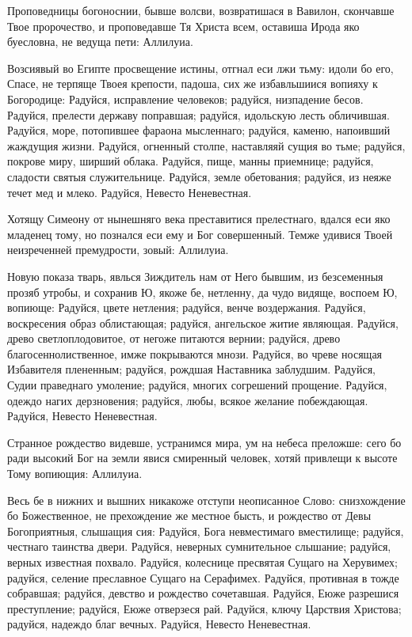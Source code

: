\begin{mymulticols}

Проповедницы богоноснии, бывше волсви, возвратишася в Вавилон, скончавше Твое пророчество, и проповедавше Тя Христа всем, оставиша Ирода яко буесловна, не ведуща пети: Аллилуиа.


Возсиявый во Египте просвещение истины, отгнал еси лжи тьму: идоли бо его, Спасе, не терпяще Твоея крепости, падоша, сих же избавльшиися вопияху к Богородице: Радуйся, исправление человеков; радуйся, низпадение бесов. Радуйся, прелести державу поправшая; радуйся, идольскую лесть обличившая. Радуйся, море, потопившее фараона мысленнаго; радуйся, каменю, напоивший жаждущия жизни. Радуйся, огненный столпе, наставляяй сущия во тьме; радуйся, покрове миру, ширший облака. Радуйся, пище, манны приемнице; радуйся, сладости святыя служительнице. Радуйся, земле обетования; радуйся, из неяже течет мед и млеко. Радуйся, Невесто Неневестная.


Хотящу Симеону от нынешняго века преставитися прелестнаго, вдался еси яко младенец тому, но познался еси ему и Бог совершенный. Темже удивися Твоей неизреченней премудрости, зовый: Аллилуиа.


Новую показа тварь, явлься Зиждитель нам от Него бывшим, из безсеменныя прозяб утробы, и сохранив Ю, якоже бе, нетленну, да чудо видяще, воспоем Ю, вопиюще: Радуйся, цвете нетления; радуйся, венче воздержания. Радуйся, воскресения образ облистающая; радуйся, ангельское житие являющая. Радуйся, древо светлоплодовитое, от негоже питаются вернии; радуйся, древо благосеннолиственное, имже покрываются мнози. Радуйся, во чреве носящая Избавителя плененным; радуйся, рождшая Наставника заблудшим. Радуйся, Судии праведнаго умоление; радуйся, многих согрешений прощение. Радуйся, одеждо нагих дерзновения; радуйся, любы, всякое желание побеждающая. Радуйся, Невесто Неневестная.


Странное рождество видевше, устранимся мира, ум на небеса преложше: сего бо ради высокий Бог на земли явися смиренный человек, хотяй привлещи к высоте Тому вопиющия: Аллилуиа.


Весь бе в нижних и вышних никакоже отступи неописанное Слово: снизхождение бо Божественное, не прехождение же местное бысть, и рождество от Девы Богоприятныя, слышащия сия: Радуйся, Бога невместимаго вместилище; радуйся, честнаго таинства двери. Радуйся, неверных сумнительное слышание; радуйся, верных известная похвало. Радуйся, колеснице пресвятая Сущаго на Херувимех; радуйся, селение преславное Сущаго на Серафимех. Радуйся, противная в тожде собравшая; радуйся, девство и рождество сочетавшая. Радуйся, Еюже разрешися преступление; радуйся, Еюже отверзеся рай. Радуйся, ключу Царствия Христова; радуйся, надеждо благ вечных. Радуйся, Невесто Неневестная.


\end{mymulticols}

